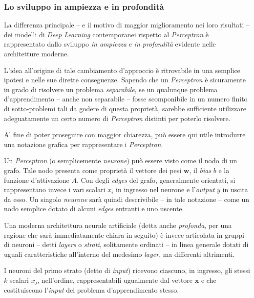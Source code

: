 \documentclass[a4paper, twoside]{article}
\begin{document}
\subsubsection{Lo sviluppo in ampiezza e in profondità}

La differenza principale -- e il motivo di maggior miglioramento nei loro risultati -- dei modelli di \textit{Deep Learning} contemporanei rispetto al \textit{Perceptron} è rappresentato dallo sviluppo \textit{in ampiezza} e \textit{in profondità} evidente nelle architetture moderne.

L'idea all'origine di tale cambiamento d'approccio è ritrovabile in una semplice ipotesi e nelle sue dirette conseguenze. Sapendo che un \textit{Perceptron} è sicuramente in grado di risolvere un problema \textit{separabile}, se un qualunque problema d'apprendimento -- anche non separabile -- fosse scomponibile in un numero finito di sotto-problemi tali da godere di questa proprietà, sarebbe sufficiente utilizzare adeguatamente un certo numero di \textit{Perceptron} distinti per poterlo risolvere.

Al fine di poter proseguire con maggior chiarezza, può essere qui utile introdurre una notazione grafica per rappresentare i \textit{Perceptron}.

Un \textit{Perceptron} (o semplicemente \textit{neurone}) può essere visto come il nodo di un grafo. Tale nodo presenta come proprietà il vettore dei pesi $\boldsymbol{w}$, il \textit{bias} $b$ e la funzione d'attivazione $A$. Con degli \textit{edges} del grafo, generalmente orientati, si rappresentano invece i vari scalari $x_i$ in ingresso nel neurone e l'\textit{output} $y$ in uscita da esso. Un singolo \textit{neurone} sarà quindi descrivibile -- in tale notazione -- come un nodo semplice dotato di alcuni \textit{edges} entranti e uno uscente.

Una moderna architettura neurale artificiale (detta anche \textit{profonda}, per una ragione che sarà immediatamente chiara in seguito) è invece articolata in gruppi di neuroni -- detti \textit{layers} o \textit{strati}, solitamente ordinati -- in linea generale dotati di uguali caratteristiche all'interno del medesimo \textit{layer}, ma differenti altrimenti.

I neuroni del primo strato (detto di \textit{input}) ricevono ciascuno, in ingresso, gli stessi $k$ scalari ${x_j}$, nell'ordine, rappresentabili ugualmente dal vettore $\boldsymbol{x}$ e che costituiscono l'\textit{input} del problema d'apprendimento stesso.
\end{document}

